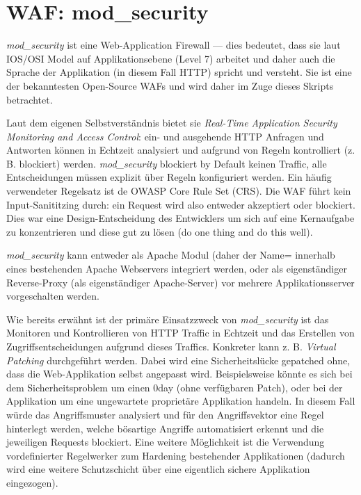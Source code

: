 \chapter{WAF: mod\_security}

\textit{mod\_security} ist eine Web-Application Firewall --- dies bedeutet, dass sie laut IOS/OSI Model auf Applikationsebene (Level 7) arbeitet und daher auch die Sprache der Applikation (in diesem Fall HTTP) spricht und versteht. Sie ist eine der bekanntesten Open-Source WAFs und wird daher im Zuge dieses Skripts betrachtet.

Laut dem eigenen Selbstverständnis bietet sie \textit{Real-Time Application Security Monitoring and Access Control}: ein- und ausgehende HTTP Anfragen und Antworten können in Echtzeit analysiert und aufgrund von Regeln kontrolliert (z. B. blockiert) werden. \textit{mod\_security} blockiert by Default keinen Traffic, alle Entscheidungen müssen explizit über Regeln konfiguriert werden. Ein häufig verwendeter Regelsatz ist de OWASP Core Rule Set (CRS). Die WAF führt kein Input-Sanititzing durch: ein Request wird also entweder akzeptiert oder blockiert. Dies war eine Design-Entscheidung des Entwicklers um sich auf eine Kernaufgabe zu konzentrieren und diese gut zu lösen (do one thing and do this well).

\textit{mod\_security} kann entweder als Apache Modul (daher der Name= innerhalb eines bestehenden Apache Webservers integriert werden, oder als eigenständiger Reverse-Proxy (als eigenständiger Apache-Server) vor mehrere Applikationsserver vorgeschalten werden.

Wie bereits erwähnt ist der primäre Einsatzzweck von \textit{mod\_security} ist das Monitoren und Kontrollieren von HTTP Traffic in Echtzeit und das Erstellen von Zugriffsentscheidungen aufgrund dieses Traffics. Konkreter kann z. B. \textit{Virtual Patching} durchgeführt werden. Dabei wird eine Sicherheitslücke gepatched ohne, dass die Web-Applikation selbst angepasst wird. Beispielsweise könnte es sich bei dem Sicherheitsproblem um einen 0day (ohne verfügbaren Patch), oder bei der Applikation um eine ungewartete proprietäre Applikation handeln. In diesem Fall würde das Angriffsmuster analysiert und für den Angriffsvektor eine Regel hinterlegt werden, welche bösartige Angriffe automatisiert erkennt und die jeweiligen Requests blockiert. Eine weitere Möglichkeit ist die Verwendung vordefinierter Regelwerker zum Hardening bestehender Applikationen (dadurch wird eine weitere Schutzschicht über eine eigentlich sichere Applikation eingezogen).

